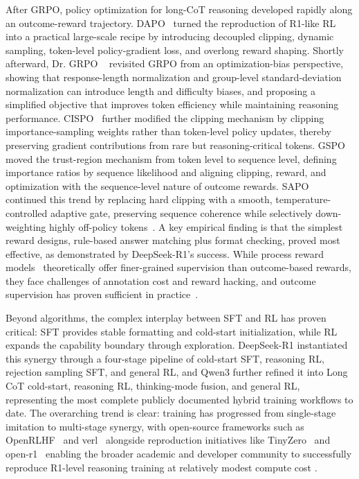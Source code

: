 After GRPO, policy optimization for long-CoT reasoning developed rapidly along an outcome-reward trajectory. DAPO~\cite{yu2026dapo} turned the reproduction of R1-like RL into a practical large-scale recipe by introducing decoupled clipping, dynamic sampling, token-level policy-gradient loss, and overlong reward shaping. Shortly afterward, Dr. GRPO ~\cite{liu2025understanding} revisited GRPO from an optimization-bias perspective, showing that response-length normalization and group-level standard-deviation normalization can introduce length and difficulty biases, and proposing a simplified objective that improves token efficiency while maintaining reasoning performance. CISPO~\cite{chen2025minimax} further modified the clipping mechanism by clipping importance-sampling weights rather than token-level policy updates, thereby preserving gradient contributions from rare but reasoning-critical tokens. GSPO~\cite{zheng2025group} moved the trust-region mechanism from token level to sequence level, defining importance ratios by sequence likelihood and aligning clipping, reward, and optimization with the sequence-level nature of outcome rewards. SAPO ~\cite{gao2025soft} continued this trend by replacing hard clipping with a smooth, temperature-controlled adaptive gate, preserving sequence coherence while selectively down-weighting highly off-policy tokens~\citep{wan2025qwenlong,kumar2025llm,kim2026correct,lu2024autopsv,chen2024alphamath}.
 A key empirical finding is that the simplest reward designs, rule-based answer matching plus format checking, proved most effective, as demonstrated by DeepSeek-R1's success. While process reward models~\cite{lightman2024lets} theoretically offer finer-grained supervision than outcome-based rewards, they face challenges of annotation cost and reward hacking, and outcome supervision has proven sufficient in practice~\citep{guo2025right,weng2023large,ahn2024large,amjad2026mathematical,poola2023tuning}.



Beyond algorithms, the complex interplay between SFT and RL has proven critical: SFT provides stable formatting and cold-start initialization, while RL expands the capability boundary through exploration. DeepSeek-R1 instantiated this synergy through a four-stage pipeline of cold-start SFT, reasoning RL, rejection sampling SFT, and general RL, and Qwen3 further refined it into Long CoT cold-start, reasoning RL, thinking-mode fusion, and general RL, representing the most complete publicly documented hybrid training workflows to date. The overarching trend is clear: training has progressed from single-stage imitation to multi-stage synergy, with open-source frameworks such as OpenRLHF~\cite{hu2024openrlhf} and verl~\cite{sheng2025hybridflow} alongside reproduction initiatives like TinyZero~\cite{pan2025tinyzero} and open-r1~\cite{openr1} enabling the broader academic and developer community to successfully reproduce R1-level reasoning training at relatively modest compute cost \citep{li2025system1system2,stechly2025self,duc2025mathematics,rugaba2026v,gull2025engtrace,yu2024ovm}.

